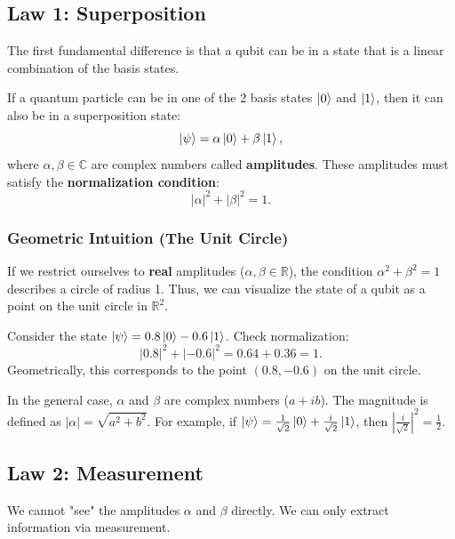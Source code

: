\subsection{Law 1: Superposition}

The first fundamental difference is that a qubit can be in a state that is a linear combination of the basis states.

\begin{definition} If a quantum particle can be in one of the 2 basis states $\ket{0}$ and $\ket{1}$, then it can also be in a superposition state:
\[
    \ket{\psi} = \alpha\ket{0} + \beta\ket{1},
\]
where $\alpha, \beta \in \mathbb{C}$ are complex numbers called \textbf{amplitudes}.
These amplitudes must satisfy the \textbf{normalization condition}:
\[
    |\alpha|^2 + |\beta|^2 = 1.
\]
\end{definition}

\subsubsection{Geometric Intuition (The Unit Circle)}
If we restrict ourselves to \textbf{real} amplitudes ($\alpha, \beta \in \mathbb{R}$), the condition $\alpha^2 + \beta^2 = 1$ describes a circle of radius 1.
Thus, we can visualize the state of a qubit as a point on the unit circle in $\mathbb{R}^2$.

\begin{example}
Consider the state $\ket{\psi} = 0.8\ket{0} - 0.6\ket{1}$.
Check normalization:
\[
    |0.8|^2 + |-0.6|^2 = 0.64 + 0.36 = 1.
\]
Geometrically, this corresponds to the point $(0.8, -0.6)$ on the unit circle.
\end{example}

\begin{remark}
In the general case, $\alpha$ and $\beta$ are complex numbers ($a + ib$). The magnitude is defined as $|\alpha| = \sqrt{a^2 + b^2}$. For example, if $\ket{\psi} = \frac{1}{\sqrt{2}}\ket{0} + \frac{i}{\sqrt{2}}\ket{1}$, then $|\frac{i}{\sqrt{2}}|^2 = \frac{1}{2}$.
\end{remark}

\subsection{Law 2: Measurement}
We cannot "see" the amplitudes $\alpha$ and $\beta$ directly. We can only extract information via measurement.

